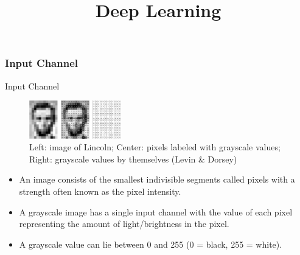 




\newcommand{\titlefigure}{figure/stride4.png}
\newcommand{\learninggoals}{
  \item Input Channel
  \item Padding
  \item Stride
  \item Pooling

}

\title{Deep Learning}
\date{}






\frametitle{Input Channel}

\begin{vbframe}{Input Channel}
         \begin{figure}
    \centering
    \includegraphics[width=4cm]{figure/gray.png}
        \caption{Left: image of Lincoln; Center: pixels labeled with grayscale values; Right: grayscale values by themselves (Levin \& Dorsey)}
  \end{figure}
    \begin{itemize}
    
       \item An image consists of the smallest indivisible segments called pixels with a strength often known as the pixel intensity. 
       
       \item A grayscale image has a single input channel with the value of each pixel representing the amount of light/brightness in the pixel.
       
       \item A grayscale value can lie between 0 and 255 (0 = black, 255 = white).
       
       
    \end{itemize}

\end{vbframe}

